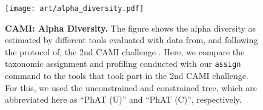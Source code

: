%
%
%


\begin{figure}[hpbt]
    \centering
    \texttt{[image: art/alpha\_diversity.pdf]}
    \begin{subfigure}{0pt}
        \label{fig:alpha_diversity:sub:total}
    \end{subfigure}
    \begin{subfigure}{0pt}
        \label{fig:alpha_diversity:sub:difference}
    \end{subfigure}
    \caption[CAMI: Alpha Diversity]{
        \textbf{CAMI: Alpha Diversity.}
        The figure shows the alpha diversity as estimated by different tools evaluated
        with data from, and following the protocol of, the 2nd CAMI challenge \citep{Sczyrba2017,Bremges2018}.
        Here, we compare the taxonomic assignment and profiling conducted with our \texttt{assign} command
        to the tools that took part in the 2nd CAMI challenge.
        For this, we used the unconstrained and constrained  tree,
        which are abbreviated here as ``PhAT (U)'' and ``PhAT (C)'', respectively.
    }
    \label{fig:alpha_diversity}
\end{figure}
